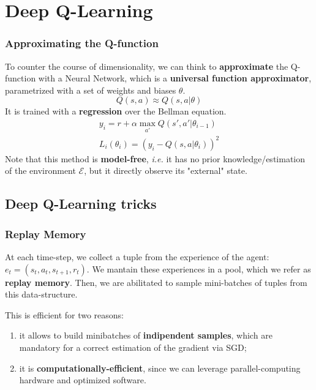 \documentclass{beamer}
\begin{document}
\section{Deep Q-Learning}
\begin{frame}
	\frametitle{Approximating the Q-function}
	To counter the course of dimensionality, we can think to \textbf{approximate} the Q-function with a Neural Network, which is a \textbf{universal function approximator}, parametrized with a set of weights and biases $\theta$.
	\begin{equation}
		Q(s, a) \approx Q(s,a| \theta)
	\end{equation}
	It is trained with a \textbf{regression} over the Bellman equation.
		\begin{equation}
\begin{aligned}
y_i =  r + \alpha \max_{a'} Q(s', a'|\theta_{i-1}) \\
L_i(\theta _i ) = (y_i - Q(s,a|\theta_i))^2
\end{aligned}
	\end{equation}
Note that this method is \textbf{model-free}, \textit{i.e.} it has no prior knowledge/estimation of the environment $\mathcal{E}$, but it directly observe its "external" state.
\end{frame}
\subsection{Deep Q-Learning tricks}

\begin{frame}
\frametitle{Replay Memory}

At each time-step, we collect a tuple from the experience of the agent: $e_t = (s_t, a_t, s_{t+1}, r_t)$. We mantain these experiences in a pool, which we refer as \textbf{replay memory}. Then, we are abilitated to sample mini-batches of tuples from this data-structure.

This is efficient for two reasons: 
\begin{enumerate}
	\item it allows to build minibatches of \textbf{indipendent samples}, which are mandatory for a correct estimation of the gradient via SGD;
	\item it is \textbf{computationally-efficient}, since we can leverage parallel-computing hardware and optimized software.
\end{enumerate}

\end{frame}
\end{document}
